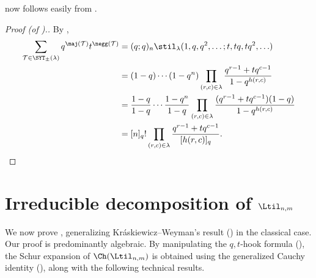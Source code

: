  now follows easily from .
\begin{proof}[Proof (of ).]
    By ,
    \begin{align*}
        \sum_{\mathcal{T} \in \SYT_\pm(\lambda)} q^{\maj(\mathcal{T})}t^{\negg(\mathcal{T})} &= (q;q)_n \stil_\lambda(1,q,q^2,\ldots;t,tq,tq^2,\ldots) \\
        &= (1-q) \cdots (1-q^n) \prod_{(r,c) \in \lambda} \frac{q^{r-1} + tq^{c-1}}{1-q^{h(r,c)}} \\
        &= \frac{1-q}{1-q} \cdots \frac{1-q^n}{1-q} \prod_{(r,c) \in \lambda} \frac{(q^{r-1} + tq^{c-1})(1-q)}{1-q^{h(r,c)}} \\
        &= [n]_q! \prod_{(r,c) \in \lambda} \frac{q^{r-1} + tq^{c-1}}{[h(r,c)]_q}. \qedhere
    \end{align*}
\end{proof}

\section{Irreducible decomposition of \texorpdfstring{$\Ltil_{n,m}$}{Ltilde-n,m}}\label{sec:super-KW}
We now prove , generalizing Kr{\'a}skiewicz--Weyman's result () in the classical case. Our proof is predominantly algebraic. By manipulating the $q,t$-hook formula (), the Schur expansion of $\Ch(\Ltil_{n,m})$ is obtained using the generalized Cauchy identity (), along with the following technical results.

